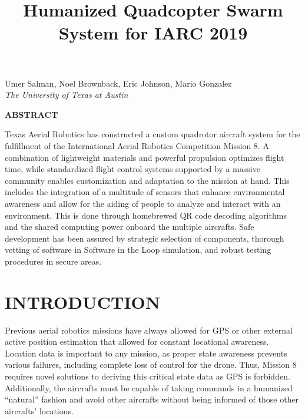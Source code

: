 \documentclass[12pt,letterpaper]{article}
\title{Humanized Quadcopter Swarm System for IARC 2019}
\newenvironment{nscenter}
 {\parskip=0pt\par\nopagebreak\centering}
 {\par\noindent\ignorespacesafterend}
\newcommand{\affiliatedauthor}[2]{
\begin{nscenter}
	#1 \\ \textit{#2}
\end{nscenter}
}
\renewcommand{\abstractname}{ABSTRACT}
\renewenvironment{abstract}
 {\vspace{-0.5ex}
	\small
	\begin{center}
		\bfseries \abstractname\vspace{-4ex}\vspace{0pt}
	\end{center}
	\list{}{
		\setlength{\leftmargin}{0.5in}
		\setlength{\rightmargin}{\leftmargin}
	}
	\item\relax}
 {\endlist}
\begin{document}
\begin{center}
	\textbf{\LARGE{\thetitle}}
\end{center}

\affiliatedauthor{Umer Salman, Noel Brownback, Eric Johnson, Mario Gonzalez}{The University of Texas at Austin}


\begin{abstract}
	Texas Aerial Robotics has constructed a custom quadrotor aircraft system for the fulfillment of the International Aerial Robotics Competition Mission 8. A combination of lightweight materials and powerful propulsion optimizes flight time, while standardized flight control systems supported by a massive community enables customization and adaptation to the mission at hand. This includes the integration of a multitude of sensors that enhance environmental awareness and allow for the aiding of people to analyze and interact with an environment. This is done through homebrewed QR code decoding algorithms and the shared computing power onboard the multiple aircrafts. Safe development has been assured by strategic selection of components, thorough vetting of software in Software in the Loop simulation, and robust testing procedures in secure areas.
\end{abstract}


\section*{INTRODUCTION}
	Previous aerial robotics missions have always allowed for GPS or other external active position estimation  that allowed for constant locational awareness. Location data is important to any mission, as proper state awareness prevents various failures, including complete loss of control for the drone. Thus, Mission 8 requires novel solutions to deriving this critical state data as GPS is forbidden. Additionally, the aircrafts must be capable of taking commands in a humanized ``natural'' fashion and avoid other aircrafts without being informed of those other aircrafts' locations.
\end{document}
